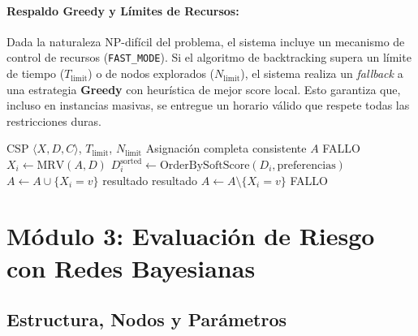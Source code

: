 \documentclass[12pt,twoside]{report}
\theoremstyle{definition}
\begin{document}
\paragraph{Respaldo Greedy y L\'imites de Recursos:}
Dada la naturaleza NP-dif\'icil del problema, el sistema incluye un mecanismo de control de recursos (\texttt{FAST\_MODE}). Si el algoritmo de backtracking supera un l\'imite de tiempo ($T_{\text{limit}}$) o de nodos explorados ($N_{\text{limit}}$), el sistema realiza un \emph{fallback} a una estrategia \textbf{Greedy} con heur\'istica de mejor score local. Esto garantiza que, incluso en instancias masivas, se entregue un horario v\'alido que respete todas las restricciones duras.

\begin{algorithm}[H]
\caption{Backtracking con MRV, Soft-scoring y l\'imite de recursos}
\label{alg:bt}
\begin{algorithmic}[1]
\Require CSP $\langle X,D,C\rangle$, $T_{\text{limit}}$, $N_{\text{limit}}$
\Ensure Asignaci\'on completa consistente
   \Return $A$ \EndIf
   \Return FALLO \EndIf
  \State $X_i \leftarrow \text{MRV}(A, D)$
  \State $D_i^{\text{sorted}} \leftarrow \text{OrderBySoftScore}(D_i, \text{preferencias})$
      \State $A \leftarrow A \cup \{X_i = v\}$
      \State resultado \leftarrow {}
       \Return resultado \EndIf
      \State $A \leftarrow A \setminus \{X_i=v\}$
    \EndIf
  \EndFor
  \Return FALLO
\EndFunction
\end{algorithmic}
\end{algorithm}

\section{M\'odulo 3: Evaluaci\'on de Riesgo con Redes Bayesianas}

\subsection{Estructura, Nodos y Par\'ametros}
\end{document}
